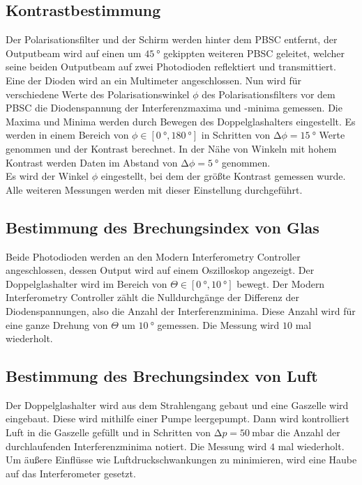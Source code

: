\subsection{Kontrastbestimmung}
\label{subsec:Kontrastbestimmmung}

\noindent Der Polarisationsfilter und der Schirm werden hinter dem PBSC entfernt, der Outputbeam wird auf einen um $\SI{45}{\degree}$ gekippten weiteren PBSC geleitet, welcher seine beiden
Outputbeam auf zwei Photodioden reflektiert und transmittiert. Eine der Dioden wird an ein Multimeter angeschlossen. Nun wird für verschiedene Werte des Polarisationswinkel $\phi$ des 
Polarisationsfilters vor dem PBSC die Diodenspannung der Interferenzmaxima und -minima gemessen. Die Maxima und Minima werden durch Bewegen des Doppelglashalters eingestellt. Es werden 
in einem Bereich von $\phi \in \left[ \SI{0}{\degree}, \SI{180}{\degree}\right]$ in Schritten von $\increment \phi = \SI{15}{\degree}$ Werte genommen und der Kontrast berechnet. In der Nähe von Winkeln 
mit hohem Kontrast werden Daten im Abstand von $\increment\phi = \SI{5}{\degree}$ genommen.\\
Es wird der Winkel $\phi$ eingestellt, bei dem der größte Kontrast gemessen wurde. Alle weiteren Messungen werden mit dieser Einstellung durchgeführt.


\subsection{Bestimmung des Brechungsindex von Glas}
\label{subsec:n_glas_Durchführung}

\noindent Beide Photodioden werden an den Modern Interferometry Controller angeschlossen, dessen Output wird auf einem Oszilloskop angezeigt. Der Doppelglashalter wird im Bereich von 
$\Theta \in \left[ \SI{0}{\degree}, \SI{10}{\degree}\right]$ bewegt. Der Modern  Interferometry Controller zählt die Nulldurchgänge der Differenz der Diodenspannungen, also die Anzahl 
der Interferenzminima. Diese Anzahl wird für eine ganze Drehung von $\Theta$ um $\SI{10}{\degree}$ gemessen. Die Messung wird $\num{10}$ mal wiederholt.


\subsection{Bestimmung des Brechungsindex von Luft}
\label{subsec:Durchführung_n_Luft}

\noindent Der Doppelglashalter wird aus dem Strahlengang gebaut und eine Gaszelle wird eingebaut. Diese wird mithilfe einer Pumpe leergepumpt. Dann wird kontrolliert Luft in die Gaszelle 
gefüllt und in Schritten von $\increment p = \SI{50}{\milli\bar}$ die Anzahl der durchlaufenden Interferenzminima notiert. Die Messung wird $\num{4}$ mal wiederholt. Um äußere Einflüsse wie 
Luftdruckschwankungen zu minimieren, wird eine Haube auf das Interferometer gesetzt. 